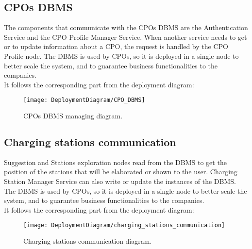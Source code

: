 \subsection{CPOs DBMS}
\label{subsec:cpo_dbms}%
The components that communicate with the CPOs DBMS are the Authentication Service and the CPO Profile Manager Service.
When another service needs to get or to update information about a CPO, the request is handled by the CPO Profile node.
The DBMS is used by CPOs, so it is deployed in a single node to better scale the system,
and to guarantee business functionalities to the companies. \\
It follows the corresponding part from the deployment diagram:
\begin{figure} [H]
    \begin{center}
        \texttt{[image: DeploymentDiagram/CPO\_DBMS]}
        \caption{CPOs DBMS managing diagram.}
        \label{fig: cpo_dbms}
    \end{center}
\end{figure}

\subsection{Charging stations communication}
\label{subsec:charging_stations_communication}%
Suggestion and Stations exploration nodes read from the DBMS
to get the position of the stations that will be elaborated or shown to the user.
Charging Station Manager Service can also write or update the instances of the DBMS\@.
The DBMS is used by CPOs, so it is deployed in a single node to better scale the system,
and to guarantee business functionalities to the companies. \\
It follows the corresponding part from the deployment diagram:
\begin{figure} [H]
    \begin{center}
        \texttt{[image: DeploymentDiagram/charging\_stations\_communication]}
        \caption{Charging stations communication diagram.}
        \label{fig: charing_stations_dbms}
    \end{center}
\end{figure}

